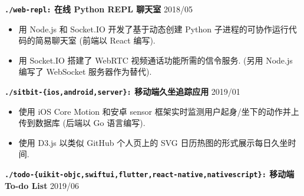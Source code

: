 \documentclass[10 pt]{article}
\begin{document}
\textbf{\texttt{./web-repl:} 在线 Python REPL 聊天室}  \hfill 2018/05 
\begin{itemize}
\item 用 Node.js 和 Socket.IO 开发了基于动态创建 Python 子进程的可协作运行代码的简易聊天室 (前端以 React 编写).
\item 用 Socket.IO 搭建了 WebRTC 视频通话功能所需的信令服务. (另用 Node.js 编写了 WebSocket 服务器作为替代).
\end{itemize}

\textbf{\texttt{./sitbit-\{ios,android,server\}:} 移动端久坐追踪应用} \hfill 2019/01
\begin{itemize}
\item 使用 iOS Core Motion 和安卓 sensor 框架实时监测用户起身/坐下的动作并上传到数据库 (后端以 Go 语言编写).
\item 使用 D3.js 以类似 GitHub 个人页上的 SVG 日历热图的形式展示每日久坐时间.
\end{itemize}

\textbf{\texttt{./todo-\{uikit-objc,swiftui,flutter,react-native,nativescript\}:} 移动端To-do List} \hfill 2019/06
\end{document}

